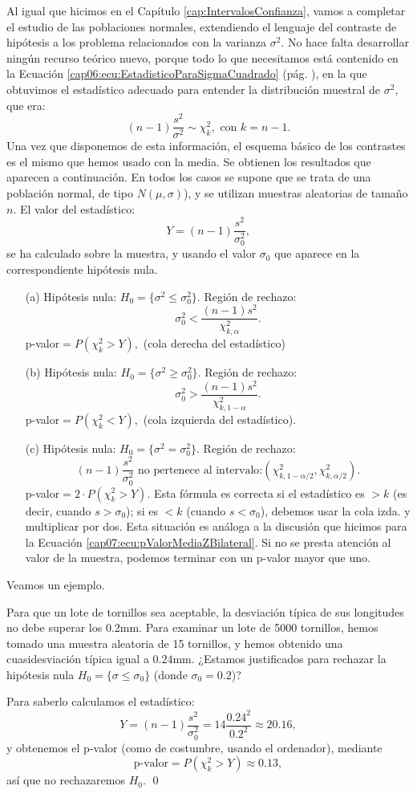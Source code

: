Al igual que hicimos en el Capítulo \ref{cap:IntervalosConfianza}, vamos a completar el estudio de las poblaciones normales, extendiendo el lenguaje del contraste de hipótesis a los problema relacionados con la varianza $\sigma^2$. No hace falta desarrollar ningún recurso teórico nuevo, porque todo lo que necesitamos está contenido en la Ecuación \ref{cap06:ecu:EstadisticoParaSigmaCuadrado} (pág. \pageref{cap06:ecu:EstadisticoParaSigmaCuadrado}), en la que obtuvimos el estadístico adecuado para entender la distribución muestral de $\sigma^2$, que era:
\[(n-1)\dfrac{s^2}{\sigma^2}\sim\chi^2_k,\mbox{ con }k=n-1.\]
Una vez que disponemos de esta información, el esquema básico de los contrastes es el mismo que hemos usado con la media. Se obtienen los resultados que aparecen a continuación. En todos los casos se supone que se trata de una población normal, de tipo $N(\mu,\sigma)$), y se utilizan muestras aleatorias de tamaño $n$. El valor del estadístico:
       \[Y=(n-1)\dfrac{s^2}{\sigma_0^2},\]
se ha calculado sobre la muestra, y usando el valor $\sigma_0$ que aparece en la correspondiente hipótesis nula.
\begin{enumerate}
       \item[(a)] Hipótesis nula: $H_0=\{\sigma^2\leq \sigma^2_0\}$. Región de rechazo: \[\sigma_0^2<\dfrac{(n-1)s^2}{\chi^2_{k,\alpha}}.\]
           p-valor$=P\left(\chi^2_k> Y\right),$ (cola derecha del estadístico)
       \item[(b)] Hipótesis nula: $H_0=\{\sigma^2\geq \sigma^2_0\}$. Región de rechazo: \[\sigma_0^2>\dfrac{(n-1)s^2}{\chi^2_{k,1-\alpha}}.\]
           p-valor$=P\left(\chi^2_k< Y\right),$ (cola izquierda del estadístico).
       \item[(c)] Hipótesis nula: $H_0=\{\sigma^2=\sigma^2_0\}$. Región de rechazo: \[(n-1)\dfrac{s^2}{\sigma_0^2}\mbox{ no pertenece al intervalo:}
            \left(\chi^2_{k,1-\alpha/2},\chi^2_{k,\alpha/2}\right).\]
           p-valor$=2\cdot P\left(\chi^2_k> Y\right)$. Esta fórmula es correcta si el estadístico es $>k$ (es decir, cuando $s>\sigma_0$); si es $<k$ (cuando $s<\sigma_0$), debemos usar la cola izda. y multiplicar por dos. Esta situación es análoga a la discusión que hicimos para la Ecuación \ref{cap07:ecu:pValorMediaZBilateral}. Si no se presta atención al valor de la muestra, podemos terminar con un p-valor mayor que uno.
\end{enumerate}
Veamos un ejemplo.

\begin{ejemplo}\label{cap07:ejem:ContrasteVarianzaLatasConserva}
Para que un lote de tornillos sea aceptable, la desviación típica de sus longitudes no debe superar los 0.2mm. Para examinar un lote de 5000 tornillos, hemos tomado una muestra aleatoria de 15 tornillos, y hemos obtenido una cuasidesviación típica igual a $0.24$mm. ¿Estamos justificados para rechazar la hipótesis nula $H_0=\{\sigma\leq \sigma_0\}$ (donde $\sigma_0=0.2$)?

Para saberlo calculamos el estadístico:
\[Y=(n-1)\dfrac{s^2}{\sigma_0^2}= 14\dfrac{0.24^2}{0.2^2}\approx 20.16,\]
y obtenemos el p-valor (como de costumbre, usando el ordenador),  mediante
\[\mbox{p-valor}=P\left(\chi^2_k> Y\right)\approx 0.13,\]
así que no rechazaremos $H_0$.
\qed
\end{ejemplo}
